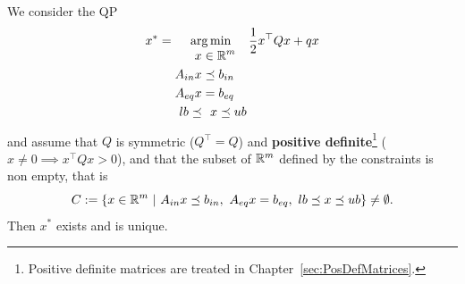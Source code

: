 \begin{tcolorbox}[sharp corners, colback=green!30, colframe=green!80!blue,title=\textbf{Useful Fact about QPs}]
We consider the QP 
\begin{equation}
    \label{eq:QPnominalForm}
        x^\ast = \operatorname*{arg\,min}_{
        \begin{aligned} x &\in \mathbb R^m \\
     A_{in} x & \preceq b_{in} \\
     A_{eq} x & = b_{eq} \\
     lb \preceq &~~x \preceq ub \end{aligned}
     } \frac{1}{2} x^\top Q x + qx
\end{equation}
and assume that $Q$ is symmetric ($Q^\top = Q$) and \textbf{positive definite}\footnote{Positive definite matrices are treated in Chapter~\ref{sec:PosDefMatrices}.} ($x \neq 0 \implies x^\top Q x >0$), and that the subset of $\mathbb R^m$ defined by the constraints is non empty, that is
\begin{equation}
    \label{eq:QPconstraintsNotEmpty}
C:=\{x \in \mathbb R^m~|~ A_{in} x  \preceq b_{in},~  A_{eq} x  = b_{eq},~ lb \preceq x \preceq ub  \} \neq \emptyset.
\end{equation} 
Then $x^\ast$ exists and is unique. \\


\end{tcolorbox}







